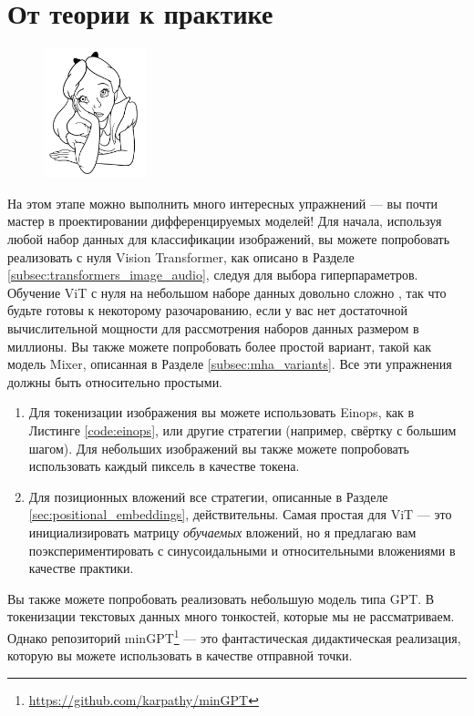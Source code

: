 \newpage
\section*{От теории к практике}

\begin{figure}
\vspace{-6em}\includegraphics[width=3.0cm]{images/shutterstock_2075221579.jpg}
\vspace{-2em}
\end{figure}

На этом этапе можно выполнить много интересных упражнений — вы почти мастер в проектировании дифференцируемых моделей! Для начала, используя любой набор данных для классификации изображений, вы можете попробовать реализовать с нуля Vision Transformer, как описано в Разделе \ref{subsec:transformers_image_audio}, следуя \cite{dosovitskiy2020image} для выбора гиперпараметров. Обучение ViT с нуля на небольшом наборе данных довольно сложно \cite{lee2021vision,steiner2021train}, так что будьте готовы к некоторому разочарованию, если у вас нет достаточной вычислительной мощности для рассмотрения наборов данных размером в миллионы. Вы также можете попробовать более простой вариант, такой как модель Mixer, описанная в Разделе \ref{subsec:mha_variants}. Все эти упражнения должны быть относительно простыми. 

\begin{enumerate}
\item Для токенизации изображения вы можете использовать Einops, как в Листинге \ref{code:einops}, или другие стратегии (например, свёртку с большим шагом). Для небольших изображений вы также можете попробовать использовать каждый пиксель в качестве токена.
\item Для позиционных вложений все стратегии, описанные в Разделе \ref{sec:positional_embeddings}, действительны. Самая простая для ViT — это инициализировать матрицу \textit{обучаемых} вложений, но я предлагаю вам поэкспериментировать с синусоидальными и относительными вложениями в качестве практики.
\end{enumerate}

Вы также можете попробовать реализовать небольшую модель типа GPT. В токенизации текстовых данных много тонкостей, которые мы не рассматриваем. Однако репозиторий minGPT\footnote{\url{https://github.com/karpathy/minGPT}} — это фантастическая дидактическая реализация, которую вы можете использовать в качестве отправной точки.
